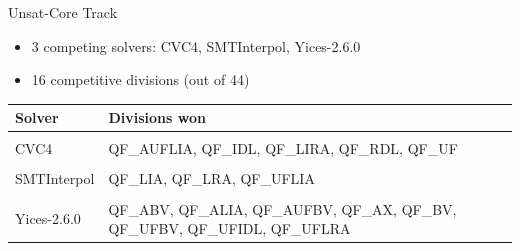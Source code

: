 \documentclass{beamer}
\begin{document}

\begin{frame}{}
  \begin{center}
    \vfill
      {\huge {}}
    \vfill
  \end{center}
\end{frame}


\begin{frame}{Unsat-Core Track}
  \begin{itemize}
  \item 3 competing solvers: CVC4, SMTInterpol, Yices-2.6.0
  \item 16 competitive divisions (out of 44)
  \end{itemize}

  \bigskip

  \begin{center}
    \begin{tabular}{lp{}}
    Solver      & Divisions won \\ \hline \\[-1.5ex]
    CVC4        & QF\_AUFLIA, QF\_IDL, QF\_LIRA, QF\_RDL, QF\_UF \\
    \\[-1.5ex]
    SMTInterpol & QF\_LIA, QF\_LRA, QF\_UFLIA \\
    \\[-1.5ex]
    Yices-2.6.0 & QF\_ABV, QF\_ALIA, QF\_AUFBV, QF\_AX, QF\_BV, QF\_UFBV, QF\_UFIDL, QF\_UFLRA
    \end{tabular}
  \end{center}

  \vspace{-1.6cm}

  \pause

\end{frame}
\end{document}

